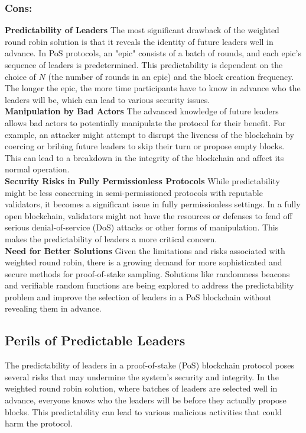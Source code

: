 \subsubsection{Cons:}
\noindent
\textbf{Predictability of Leaders}
The most significant drawback of the weighted round robin solution is that it reveals the identity of future leaders well in advance. In PoS protocols, an "epic" consists of a batch of rounds, and each epic's sequence of leaders is predetermined. This predictability is dependent on the choice of $N$ (the number of rounds in an epic) and the block creation frequency. The longer the epic, the more time participants have to know in advance who the leaders will be, which can lead to various security issues.\\

\noindent
\textbf{Manipulation by Bad Actors}
The advanced knowledge of future leaders allows bad actors to potentially manipulate the protocol for their benefit. For example, an attacker might attempt to disrupt the liveness of the blockchain by coercing or bribing future leaders to skip their turn or propose empty blocks. This can lead to a breakdown in the integrity of the blockchain and affect its normal operation.\\

\noindent
\textbf{Security Risks in Fully Permissionless Protocols}
While predictability might be less concerning in semi-permissioned protocols with reputable validators, it becomes a significant issue in fully permissionless settings. In a fully open blockchain, validators might not have the resources or defenses to fend off serious denial-of-service (DoS) attacks or other forms of manipulation. This makes the predictability of leaders a more critical concern.\\

\noindent
\textbf{Need for Better Solutions}
Given the limitations and risks associated with weighted round robin, there is a growing demand for more sophisticated and secure methods for proof-of-stake sampling. Solutions like randomness beacons and verifiable random functions are being explored to address the predictability problem and improve the selection of leaders in a PoS blockchain without revealing them in advance.

\subsection{Perils of Predictable Leaders}
The predictability of leaders in a proof-of-stake (PoS) blockchain protocol poses several risks that may undermine the system's security and integrity. In the weighted round robin solution, where batches of leaders are selected well in advance, everyone knows who the leaders will be before they actually propose blocks. This predictability can lead to various malicious activities that could harm the protocol.

